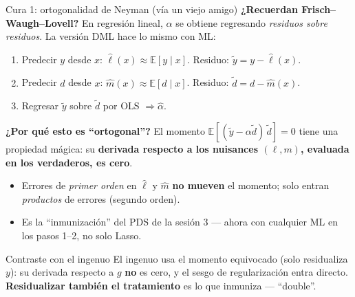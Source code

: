 \documentclass{beamer}
\newcommand{\E}{\mathbb{E}}
\newcommand{\1}{\mathbb{I}}
\begin{document}
\begin{frame}{Cura 1: ortogonalidad de Neyman (vía un viejo amigo)}
\small
\textbf{¿Recuerdan Frisch--Waugh--Lovell?} En regresión lineal, $\hat{\alpha}$ se obtiene regresando \emph{residuos sobre residuos}. La versión DML hace lo mismo con ML:
\pause
\begin{enumerate}\itemsep3pt
  \item Predecir $y$ desde $x$: $\hat{\ell}(x) \approx \E[y \mid x]$. Residuo: $\tilde{y} = y - \hat{\ell}(x)$.
  \item Predecir $d$ desde $x$: $\hat{m}(x) \approx \E[d \mid x]$. Residuo: $\tilde{d} = d - \hat{m}(x)$.
  \item Regresar $\tilde{y}$ sobre $\tilde{d}$ por OLS $\Rightarrow \hat{\alpha}$.
\end{enumerate}
\pause

\textbf{¿Por qué esto es ``ortogonal''?} El momento $\E[(\tilde{y} - \alpha \tilde{d})\,\tilde{d}] = 0$ tiene una propiedad mágica: su \textbf{derivada respecto a los nuisances $(\ell, m)$, evaluada en los verdaderos, es cero}.
\begin{itemize}\itemsep3pt
  \item Errores de \emph{primer orden} en $\hat{\ell}$ y $\hat{m}$ \textbf{no mueven} el momento; solo entran \emph{productos} de errores (segundo orden).
  \item Es la ``inmunización'' del PDS de la sesión 3 --- ahora con cualquier ML en los pasos 1--2, no solo Lasso. \pause
\end{itemize}

\begin{block}{Contraste con el ingenuo}
El ingenuo usa el momento equivocado (solo residualiza $y$): su derivada respecto a $g$ \textbf{no} es cero, y el sesgo de regularización entra directo. \textbf{Residualizar también el tratamiento} es lo que inmuniza --- ``double''.
\end{block}
\end{frame}
\end{document}

